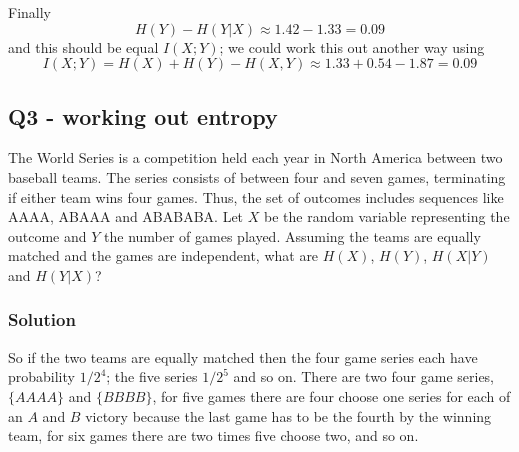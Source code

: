 \documentclass[12pt]{article}
\begin{document}
Finally
\begin{equation}
  H(Y)-H(Y|X)\approx 1.42-1.33 = 0.09
\end{equation}
and this should be equal $I(X;Y)$; we could work this out another way using
\begin{equation}
  I(X;Y)=H(X)+H(Y)-H(X,Y)\approx 1.33+0.54-1.87=0.09
\end{equation}

\subsection*{Q3 - working out entropy}

The World Series is a competition held each year in North America
between two baseball teams. The series consists of between four and
seven games, terminating if either team wins four games. Thus, the set
of outcomes includes sequences like AAAA, ABAAA and ABABABA. Let $X$
be the random variable representing the outcome and $Y$ the number of
games played. Assuming the teams are equally matched and the games are
independent, what are $H(X)$, $H(Y)$, $H(X|Y)$ and $H(Y|X)$?

\subsubsection*{Solution}

So if the two teams are equally matched then the four game series each
have probability $1/2^4$; the five series $1/2^5$ and so on. There are
two four game series, $\{AAAA\}$ and $\{BBBB\}$, for five games there
are four choose one series for each of an $A$ and $B$ victory because
the last game has to be the fourth by the winning team, for six games
there are two times five choose two, and so on.
\end{document}
